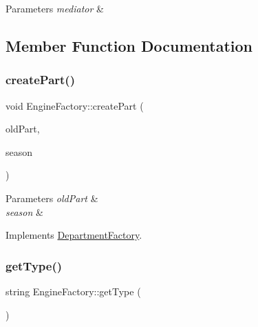 \begin{DoxyParams}{Parameters}
{\em mediator} & \\
\hline
\end{DoxyParams}


\subsection{Member Function Documentation}
\mbox{\label{classEngineFactory_af8c2f4bf420b5d2f0742b3d38746cf40}} 
\subsubsection{\texorpdfstring{create\+Part()}{createPart()}}
{\footnotesize\ttfamily void Engine\+Factory\+::create\+Part (\begin{DoxyParamCaption}\item[{\hyperlink{classDepartmentOutput}{Department\+Output} $\ast$}]{old\+Part,  }\item[{string}]{season }\end{DoxyParamCaption})\hspace{0.3cm}{\ttfamily [virtual]}}


\begin{DoxyParams}{Parameters}
{\em old\+Part} & \\
\hline
{\em season} & \\
\hline
\end{DoxyParams}


Implements \hyperlink{classDepartmentFactory_a6080a560efb9fe0b9c870db5a7358886}{Department\+Factory}.

\mbox{\label{classEngineFactory_a52fd49ea32ab2dc62aa8c86e058fb138}} 
\subsubsection{\texorpdfstring{get\+Type()}{getType()}}
{\footnotesize\ttfamily string Engine\+Factory\+::get\+Type (\begin{DoxyParamCaption}{ }\end{DoxyParamCaption})\hspace{0.3cm}{\ttfamily [virtual]}}

